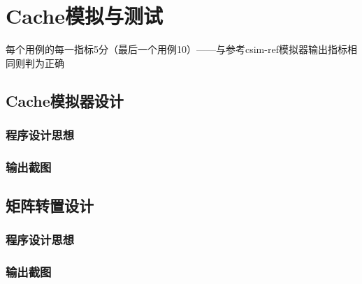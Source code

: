 \section{Cache模拟与测试}
\begin{center}
    每个用例的每一指标5分（最后一个用例10）——与参考csim-ref模拟器输出指标相同则判为正确
\end{center}

\subsection{Cache模拟器设计}


\subsubsection{程序设计思想}

\subsubsection{输出截图}


\subsection{矩阵转置设计}


\subsubsection{程序设计思想}

\subsubsection{输出截图}


